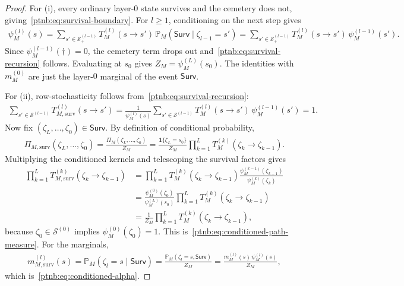 \begin{proof}
For (i), every ordinary layer-$0$ state survives and the cemetery does not,
giving~\eqref{ptnb:eq:survival-boundary}. For $l\ge1$, conditioning on the next step gives
\begin{align}
    \psi_M^{(l)}(s)
    =
    \sum_{s' \in \mathcal{S}^{(l-1)}_+}
    T_M^{(l)}(s \to s')\, \mathbb{P}_M(\mathsf{Surv} \mid \zeta_{l-1} = s')
    =
    \sum_{s' \in \mathcal{S}^{(l-1)}_+}
    T_M^{(l)}(s \to s')\, \psi_M^{(l-1)}(s').
\end{align}
Since $\psi_M^{(l-1)}(\dagger)=0$, the cemetery term drops out and~\eqref{ptnb:eq:survival-recursion}
follows.  Evaluating at $s_0$ gives $Z_M = \psi_M^{(L)}(s_0)$.  The identities with $m_M^{(0)}$ are
just the layer-$0$ marginal of the event $\mathsf{Surv}$.

For (ii), row-stochasticity follows from~\eqref{ptnb:eq:survival-recursion}:
\begin{align}
    \sum_{s' \in \mathcal{S}^{(l-1)}} T_{M,\mathrm{surv}}^{(l)}(s \to s')
    =
    \frac{1}{\psi_M^{(l)}(s)}
    \sum_{s' \in \mathcal{S}^{(l-1)}} T_M^{(l)}(s \to s')\, \psi_M^{(l-1)}(s')
    = 1.
\end{align}
Now fix $(\zeta_L,\ldots,\zeta_0) \in \mathsf{Surv}$.  By definition of conditional probability,
\begin{align}
    \Pi_{M,\mathrm{surv}}(\zeta_L,\ldots,\zeta_0)
    =
    \frac{\Pi_M(\zeta_L,\ldots,\zeta_0)}{Z_M}
    =
    \frac{\mathbf{1}\{\zeta_L=s_0\}}{Z_M}
    \prod_{k=1}^{L} T_M^{(k)}(\zeta_k \to \zeta_{k-1}).
\end{align}
Multiplying the conditioned kernels and telescoping the survival factors gives
\begin{align}
    \prod_{k=1}^{L} T_{M,\mathrm{surv}}^{(k)}(\zeta_k \to \zeta_{k-1})
    &=
    \prod_{k=1}^{L}
    T_M^{(k)}(\zeta_k \to \zeta_{k-1})
    \frac{\psi_M^{(k-1)}(\zeta_{k-1})}{\psi_M^{(k)}(\zeta_k)} \\
    &=
    \frac{\psi_M^{(0)}(\zeta_0)}{\psi_M^{(L)}(s_0)}
    \prod_{k=1}^{L} T_M^{(k)}(\zeta_k \to \zeta_{k-1}) \\
    &=
    \frac{1}{Z_M}
    \prod_{k=1}^{L} T_M^{(k)}(\zeta_k \to \zeta_{k-1}),
\end{align}
because $\zeta_0 \in \mathcal{S}^{(0)}$ implies $\psi_M^{(0)}(\zeta_0)=1$.  This
is~\eqref{ptnb:eq:conditioned-path-measure}.  For the marginals,
\begin{align}
    m_{M,\mathrm{surv}}^{(l)}(s)
    =
    \mathbb{P}_M(\zeta_l = s \mid \mathsf{Surv})
    =
    \frac{\mathbb{P}_M(\zeta_l = s, \mathsf{Surv})}{Z_M}
    =
    \frac{m_M^{(l)}(s)\, \psi_M^{(l)}(s)}{Z_M},
\end{align}
which is~\eqref{ptnb:eq:conditioned-alpha}.


\end{proof}
